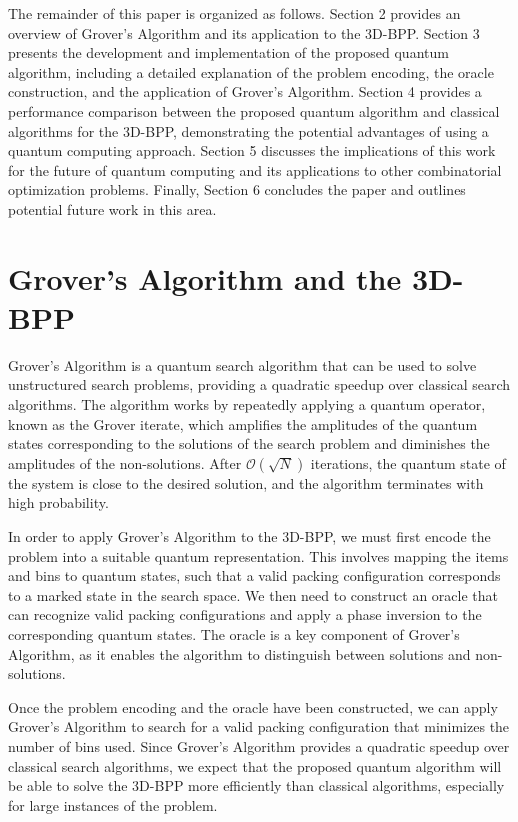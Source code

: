 The remainder of this paper is organized as follows. Section 2 provides an overview of Grover's Algorithm and its application to the 3D-BPP. Section 3 presents the development and implementation of the proposed quantum algorithm, including a detailed explanation of the problem encoding, the oracle construction, and the application of Grover's Algorithm. Section 4 provides a performance comparison between the proposed quantum algorithm and classical algorithms for the 3D-BPP, demonstrating the potential advantages of using a quantum computing approach. Section 5 discusses the implications of this work for the future of quantum computing and its applications to other combinatorial optimization problems. Finally, Section 6 concludes the paper and outlines potential future work in this area.

\section{Grover's Algorithm and the 3D-BPP}
Grover's Algorithm is a quantum search algorithm that can be used to solve unstructured search problems, providing a quadratic speedup over classical search algorithms. The algorithm works by repeatedly applying a quantum operator, known as the Grover iterate, which amplifies the amplitudes of the quantum states corresponding to the solutions of the search problem and diminishes the amplitudes of the non-solutions. After $\mathcal{O}(\sqrt{N})$ iterations, the quantum state of the system is close to the desired solution, and the algorithm terminates with high probability.

In order to apply Grover's Algorithm to the 3D-BPP, we must first encode the problem into a suitable quantum representation. This involves mapping the items and bins to quantum states, such that a valid packing configuration corresponds to a marked state in the search space. We then need to construct an oracle that can recognize valid packing configurations and apply a phase inversion to the corresponding quantum states. The oracle is a key component of Grover's Algorithm, as it enables the algorithm to distinguish between solutions and non-solutions.

Once the problem encoding and the oracle have been constructed, we can apply Grover's Algorithm to search for a valid packing configuration that minimizes the number of bins used. Since Grover's Algorithm provides a quadratic speedup over classical search algorithms, we expect that the proposed quantum algorithm will be able to solve the 3D-BPP more efficiently than classical algorithms, especially for large instances of the problem.

